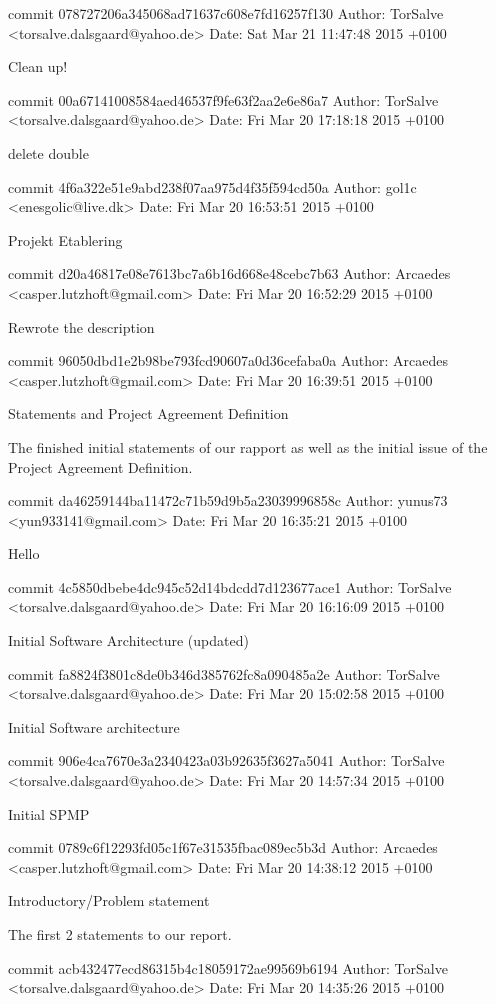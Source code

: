 \documentclass[12pt,a4paper]{article}
\begin{document}
commit 078727206a345068ad71637c608e7fd16257f130
Author: TorSalve <torsalve.dalsgaard@yahoo.de>
Date:   Sat Mar 21 11:47:48 2015 +0100

Clean up!

commit 00a67141008584aed46537f9fe63f2aa2e6e86a7
Author: TorSalve <torsalve.dalsgaard@yahoo.de>
Date:   Fri Mar 20 17:18:18 2015 +0100

delete double

commit 4f6a322e51e9abd238f07aa975d4f35f594cd50a
Author: gol1c <enesgolic@live.dk>
Date:   Fri Mar 20 16:53:51 2015 +0100

Projekt Etablering

commit d20a46817e08e7613bc7a6b16d668e48cebc7b63
Author: Arcaedes <casper.lutzhoft@gmail.com>
Date:   Fri Mar 20 16:52:29 2015 +0100

Rewrote the description

commit 96050dbd1e2b98be793fcd90607a0d36cefaba0a
Author: Arcaedes <casper.lutzhoft@gmail.com>
Date:   Fri Mar 20 16:39:51 2015 +0100

Statements and Project Agreement Definition

The finished initial statements of our rapport as well as the initial
issue of the Project Agreement Definition.

commit da46259144ba11472c71b59d9b5a23039996858c
Author: yunus73 <yun933141@gmail.com>
Date:   Fri Mar 20 16:35:21 2015 +0100

Hello

commit 4c5850dbebe4dc945c52d14bdcdd7d123677ace1
Author: TorSalve <torsalve.dalsgaard@yahoo.de>
Date:   Fri Mar 20 16:16:09 2015 +0100

Initial Software Architecture (updated)

commit fa8824f3801c8de0b346d385762fc8a090485a2e
Author: TorSalve <torsalve.dalsgaard@yahoo.de>
Date:   Fri Mar 20 15:02:58 2015 +0100

Initial Software architecture

commit 906e4ca7670e3a2340423a03b92635f3627a5041
Author: TorSalve <torsalve.dalsgaard@yahoo.de>
Date:   Fri Mar 20 14:57:34 2015 +0100

Initial SPMP

commit 0789c6f12293fd05c1f67e31535fbac089ec5b3d
Author: Arcaedes <casper.lutzhoft@gmail.com>
Date:   Fri Mar 20 14:38:12 2015 +0100

Introductory/Problem statement

The first 2 statements to our report.

commit acb432477ecd86315b4c18059172ae99569b6194
Author: TorSalve <torsalve.dalsgaard@yahoo.de>
Date:   Fri Mar 20 14:35:26 2015 +0100
\end{document}
